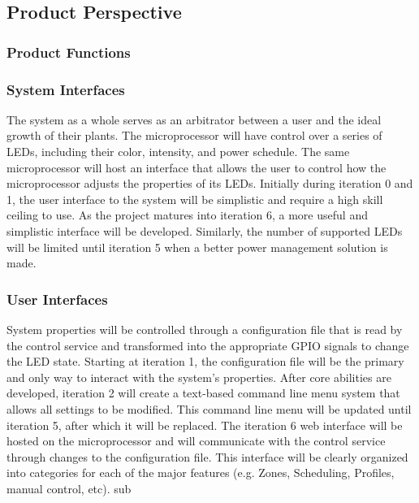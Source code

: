 \documentclass[onecolumn, draftclsnofoot,10pt, compsoc]{IEEEtran}
\begin{document}
		\subsection*{Product Perspective}

		\subsubsection*{Product Functions}

				\subsubsection*{System Interfaces}
				The system as a whole serves as an arbitrator between a user and the ideal growth of their plants.
				The microprocessor will have control over a series of LEDs, including their color, intensity, and power schedule. The same microprocessor will host an interface that allows the user to control
				how the microprocessor adjusts the properties of its LEDs. Initially during iteration 0 and 1, the user interface to the system will be simplistic and require a high skill ceiling to use. As the project matures into iteration 6, a more useful and
				simplistic interface will be developed. Similarly, the number of supported LEDs will be limited until iteration 5 when a better power management solution is made.
				\subsubsection*{User Interfaces}
					System properties will be controlled through a configuration file that is read by the control service and transformed into the appropriate GPIO signals to change the LED state. Starting at
					iteration 1, the configuration file will be the primary and only way to interact with the system’s properties. After core abilities are developed, iteration 2 will create a text-based command
					line menu system that allows all settings to be modified. This command line menu will be updated until iteration 5, after which it will be replaced.
					The iteration 6 web interface will be hosted on the microprocessor and will communicate with the control service through changes to the configuration file. This interface will be clearly
					 organized into categories for each of the major features (e.g. Zones, Scheduling, Profiles, manual control, etc).
					 sub
\end{document}
